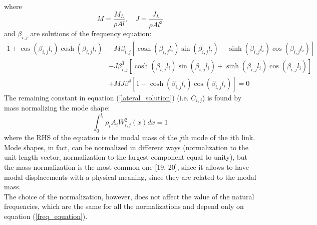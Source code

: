 \documentclass[a4paper,12pt,oneside]{report}
\begin{document}
where 
\begin{equation}
  M=\frac{M_L}{\rho A l}, \quad J=\frac{J_L}{\rho Al^3}
\end{equation}
and $\beta_{i,j}$ are solutions of the frequency equation:
\begin{equation}
  \begin{split}
  1+\cos{(\beta_{i,j}l_i)}\cosh{(\beta_{i,j}l_i)}&-M\beta_{i,j}[\cosh{(\beta_{i,j}l_i)}\sin{(\beta_{i,j}l_i)}-\sinh{(\beta_{i,j}l_i)}\cos{(\beta_{i,j}l_i)}]\\
  &-J\beta_{i,j}^3[\cosh{(\beta_{i,j}l_i)}\sin{(\beta_{i,j}l_i)}+\sinh{(\beta_{i,j}l_i)}\cos{(\beta_{i,j}l_i)}]\\
  &+MJ\beta^4[1-\cosh{(\beta_{i,j}l_i)}\cos{(\beta_{i,j}l_i)}]=0
  \end{split}
  \label{freq_equation}
\end{equation}
The remaining constant in equation (\ref{lateral_solution}) (i.e. $C_{i,j}$) is found by mass normalizing the mode shape:
\begin{equation}
  \int_{0}^{l_i}\rho_i A_i W_{i,j}^2(x)dx=1
\end{equation}
where the RHS of the equation is the modal mass of the $j$th mode of the $i$th link.\\
Mode shapes, in fact, can be normalized in different ways (normalization to the unit length vector, normalization to the largest component equal to unity), but the mass normalization is the most common one [19, 20], since it allows to have modal displacements with a physical meaning, since they are related to the modal mass.\\
The choice of the normalization, however, does not affect the value of the natural frequencies, which are the same for all the normalizations and depend only on equation (\ref{freq_equation}).\\
\end{document}
